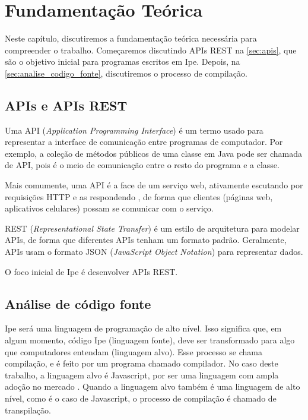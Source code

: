 
\chapter{Fundamentação Teórica}

Neste capítulo, discutiremos a fundamentação teórica necessária para compreender
o trabalho. Começaremos discutindo APIs REST na \autoref{sec:apis}, que são o
objetivo inicial para programas escritos em Ipe. Depois, na \autoref{sec:analise_codigo_fonte},
discutiremos o processo de compilação.

\section{APIs e APIs REST}\label{sec:apis}

Uma API (\textit{Application Programming Interface}) é um termo usado para representar
a interface de comunicação entre programas de computador. Por exemplo, a coleção
de métodos públicos de uma classe em Java pode ser chamada de API, pois é o
meio de comunicação entre o resto do programa e a classe.

Mais comumente, uma API é a face de um serviço web, ativamente escutando por
requisições HTTP e as respondendo \cite{restapirulebook}, de forma que clientes
(páginas web, aplicativos celulares) possam se comunicar com o serviço.

REST (\textit{Representational State Transfer}) é um estilo de arquitetura para
modelar APIs, de forma que diferentes APIs tenham um formato padrão. Geralmente,
APIs usam o formato JSON (\textit{JavaScript Object Notation}) para representar
dados.

O foco inicial de Ipe é desenvolver APIs REST.

\section{Análise de código fonte}\label{sec:analise_codigo_fonte}

Ipe será uma linguagem de programação de alto nível. Isso significa que, em algum
momento, código Ipe (linguagem fonte), deve ser transformado para algo que
computadores entendam (linguagem alvo). Esse processo se chama compilação, e é
feito por um programa chamado compilador. No caso deste trabalho, a linguagem
alvo é Javascript, por ser uma linguagem com ampla adoção no mercado \cite{stackoverflowsurvey}.
Quando a linguagem alvo também é uma linguagem de alto nível, como é o caso de
Javascript, o processo de compilação é chamado de transpilação.

